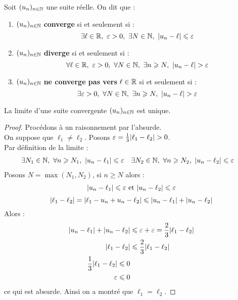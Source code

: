 \begin{definition}
    Soit $(u_n)_{n \in \mathbb{N}}$ une suite réelle. On dit que :
    \begin{enumerate}
        \item $(u_n)_{n \in \mathbb{N}}$ \textbf{converge} si et seulement si : 
        \[ \exists \ell \in \R,\ \varepsilon > 0,\ \exists N \in \N,\ \abs{u_n - \ell} \leq \varepsilon \]
        \item $(u_n)_{n \in \mathbb{N}}$ \textbf{diverge} si et seulement si : 
        \[ \forall \ell \in \R,\ \varepsilon > 0,\ \forall N \in \N,\ \exists n \geq N,\ \abs{u_n - \ell} > \varepsilon \]
        \item $(u_n)_{n \in \mathbb{N}}$ \textbf{ne converge pas vers} $\ell \in \mathbb{R}$ si et seulement si : 
        \[ \exists \varepsilon > 0,\ \forall N \in \mathbb{N},\ \exists n \geqslant N,\ \abs{u_n - \ell} > \varepsilon \]
    \end{enumerate}
\end{definition}

\begin{theorem}
    La limite d'une suite convergente $(u_n)_{n \in \mathbb{N}}$ est unique.
\end{theorem}

\begin{proof}
    Procédons à un raisonnement par l'absurde.
    \\
    On suppose que $\ell_1 \neq \ell_2$. Posons $\varepsilon = \frac{1}{3} \abs{\ell_1 - \ell_2} > 0$.
    \\
    Par définition de la limite :
    \begin{align*}
        &\exists N_1 \in \mathbb{N},\ \forall n \geqslant N_1,\ \abs{u_n - \ell_1} \leqslant \varepsilon 
        &
        &\exists N_2 \in \mathbb{N},\ \forall n \geqslant N_2,\ \abs{u_n - \ell_2} \leqslant \varepsilon
    \end{align*}
    Posons $N = \max(N_1, N_2)$, si $n \geq N$ alors :
    \begin{align*}
        \abs{u_n - \ell_1} \leqslant \varepsilon \text{ et } \abs{u_n - \ell_2} \leqslant \varepsilon
    \end{align*}
    \[ \abs{\ell_1 - \ell_2} = \abs{\ell_1 - u_n + u_n - \ell_2} \leqslant \abs{u_n - \ell_1} + \abs{u_n - \ell_2} \]
    Alors : 
    \begin{align*}
        \abs{u_n - \ell_1} + \abs{u_n - \ell_2} &\leqslant \varepsilon + \varepsilon = \frac{2}{3} \abs{\ell_1 - \ell_2} \\
        \abs{\ell_1 - \ell_2} &\leqslant \frac{2}{3} \abs{\ell_1 - \ell_2} \\
        \frac{1}{3} \abs{\ell_1 - \ell_2} \leqslant 0 \\
        \varepsilon \leqslant 0
    \end{align*}
    ce qui est absurde. Ainsi on a montré que $\ell_1 = \ell_2$.
\end{proof}

